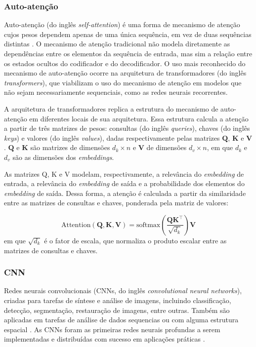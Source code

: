 \subsubsection{Auto-atenção}
Auto-atenção (do inglês \textit{self-attention}) é uma forma de mecanismo de
atenção cujos pesos dependem apenas de uma única sequência, em vez de duas
sequências distintas \cite{kim2017structured}. O mecanismo de atenção
tradicional não modela diretamente as dependências entre os elementos da
sequência de entrada, mas sim a relação entre os estados ocultos do codificador
e do decodificador. O uso mais reconhecido do mecanismo de auto-atenção ocorre
na arquitetura de transformadores (do inglês \textit{transformers}), que
viabilizam o uso do mecanismo de atenção em modelos que não sejam
necessariamente sequenciais, como as redes neurais recorrentes.

A arquitetura de transformadores replica a estrutura do mecanismo de
auto-atenção em diferentes locais de sua arquitetura. Essa estrutura calcula a
atenção a partir de três matrizes de pesos: consultas (do inglês
\textit{queries}), chaves (do inglês \textit{keys}) e valores (do inglês
\textit{values}), dadas respectivamente pelas matrizes $\mathbf{Q}$,
$\mathbf{K}$ e $\mathbf{V}$. $\mathbf{Q}$ e $\mathbf{K}$ são matrizes de dimensões $d_k
\times n$ e $\mathbf{V}$ de dimensões $d_v \times n$, em que $d_k$ e $d_v$
são as dimensões dos \textit{embeddings}.


As matrizes Q, K e V modelam, respectivamente, a
relevância do \textit{embedding} de entrada, a relevância do \textit{embedding}
de saída e a probabilidade dos elementos do \textit{embedding} de saída.
Dessa forma, a atenção é calculada a partir da similaridade entre as matrizes de
consultas e chaves, ponderada pela matriz de valores:

\begin{equation}
    \text{Attention}(\mathbf{Q}, \mathbf{K}, \mathbf{V}) = \text{softmax}(\frac{\mathbf{QK}^\top}{\sqrt{d_k}})\mathbf{V}
\end{equation}
em que $\sqrt{d_k}$ é o fator de escala, que normaliza o produto escalar entre
as matrizes de consultas e chaves.

\subsubsection{CNN}
Redes neurais convolucionais (CNNs, do inglês \textit{convolutional neural
networks}), criadas para tarefas de síntese e análise de imagens, incluindo
classificação, detecção, segmentação, restauração de imagens, entre outras.
Também são aplicadas em tarefas de análise de dados sequencias ou com alguma
estrutura espacial \cite{Bishop:DeepLearning24}. As CNNs foram as primeiras
redes neurais profundas a serem implementadas e distribuídas com sucesso em
aplicações práticas \cite{lecun1989}.

